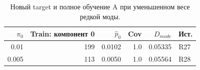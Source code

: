 \begin{table}[H]\centering\small
\setlength{\tabcolsep}{4pt}
\caption{Новый target и полное обучение A при уменьшенном весе редкой моды.}\label{tab:rare}
\begin{tabular}{rrrrrl}
\toprule
$\pi_0$ & Train: компонент 0 & $\hat p_0$ & Cov & $D_{mode}$ & Ист. \\
\midrule
0.01 & 199 & 0.0102 & 1.0 & 0.05335 & R27 \\
0.005 & 113 & 0.0050 & 1.0 & 0.05564 & R28 \\
\bottomrule
\end{tabular}
\end{table}
